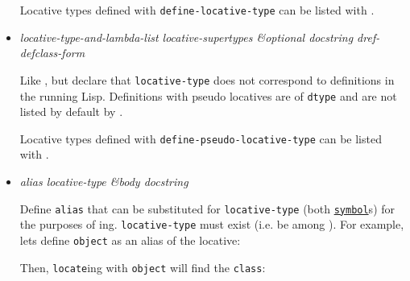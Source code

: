 \begin{itemize}
  Locative types defined with \texttt{define-locative-type} can be
  listed with
  .
\item
  \label{x-28DREF-EXT-3ADEFINE-PSEUDO-LOCATIVE-TYPE-20MGL-PAX-3AMACRO-29}
  \emph{locative-type-and-lambda-list locative-supertypes \&optional
  docstring dref-defclass-form}

  Like
  ,
  but declare that \texttt{locative-type} does not correspond to
  definitions in the running Lisp. Definitions with pseudo locatives are
  of \texttt{dtype}
   and are
  not listed by default by
  .

  Locative types defined with \texttt{define-pseudo-locative-type} can
  be listed with
  .
\item
  \label{x-28DREF-EXT-3ADEFINE-LOCATIVE-ALIAS-20MGL-PAX-3AMACRO-29}
  \emph{alias locative-type \&body docstring}

  Define \texttt{alias} that can be substituted for
  \texttt{locative-type} (both
  \href{http://www.lispworks.com/documentation/HyperSpec/Body/t_symbol.htm}{\texttt{symbol}}s)
  for the purposes of
  ing.
  \texttt{locative-type} must exist (i.e. be among
  ).
  For example, let\textquotesingle s define \texttt{object} as an alias
  of the 
  locative:

\begin{Shaded}
\begin{Highlighting}[]
\NormalTok{)}
\end{Highlighting}
\end{Shaded}

  Then, \texttt{locate}ing with \texttt{object} will find the
  \texttt{class}:


\end{itemize}
